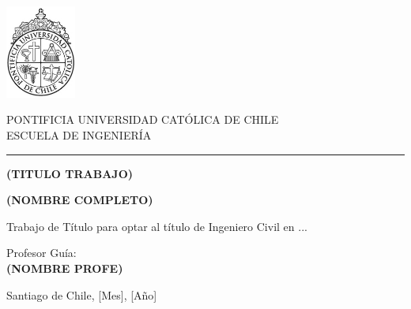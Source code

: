 
\begin{minipage}{0.2\textwidth}
    \includegraphics[width=2.3cm]{content/logo.png}
\end{minipage}%
\hspace{0cm} %
\begin{minipage}{0.75\textwidth}
    \raggedright %
    PONTIFICIA UNIVERSIDAD CATÓLICA DE CHILE\\
    ESCUELA DE INGENIERÍA
\end{minipage}

\vspace{0.2cm}
\hrule
\vspace{4cm}

\hspace{3.8cm}
\begin{minipage}{\textwidth - 7.5cm}
\begin{center}
    {\LARGE\textbf{(TITULO TRABAJO)}}

    \vspace{2cm}
    {\large\textbf{(NOMBRE COMPLETO)}}
\end{center}

\vspace{2cm}

\noindent Trabajo de Título para optar al título de Ingeniero Civil en ...

\vspace{1cm}

\noindent Profesor Guía:\\
\textbf{(NOMBRE PROFE)}

\vspace{3cm}

\begin{flushleft}
    Santiago de Chile, [Mes], [Año]
\end{flushleft}
\end{minipage}
\newpage
